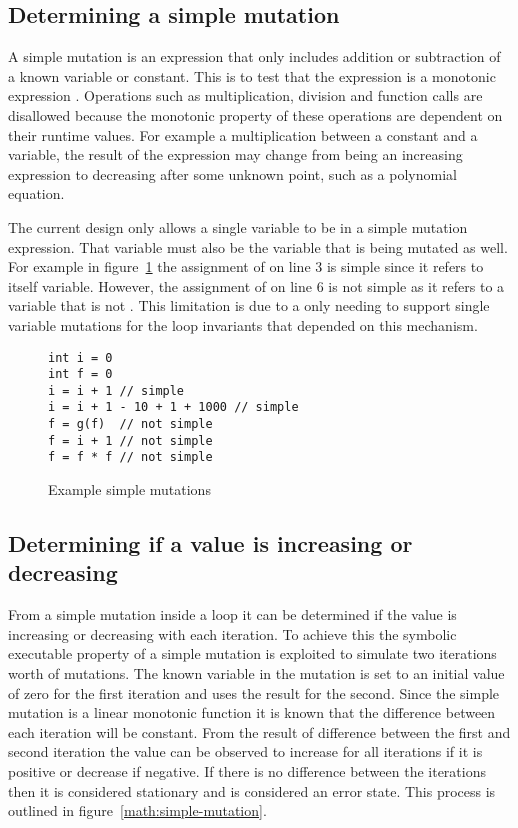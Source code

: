 \subsection{Determining a simple mutation}\label{s:simple-mut}


A simple mutation is an expression that only includes addition or subtraction
of a known variable or constant.
This is to test that the expression is a monotonic expression \cite{tanton2005encyclopedia}.
Operations such as multiplication, division and function calls are disallowed
because the monotonic property of these operations are dependent on their
runtime values.
For example a multiplication between a constant and a variable,
the result of the expression may change from being an increasing expression
to decreasing after some unknown point, such as a polynomial equation.

The current design only allows a single variable to be in a simple mutation
expression.
That variable must also be the variable that is being mutated as well.
For example in figure~\ref{lst:simple-mutations} the assignment of  on
line 3 is simple since it refers to itself variable.
However, the assignment of  on line 6 is not simple as
it refers to a variable that is not .
This limitation is due to a only needing to 
support single variable mutations for the loop invariants
that depended on this mechanism.

\begin{figure}[ht]
\begin{lstlisting}
int i = 0
int f = 0
i = i + 1 // simple
i = i + 1 - 10 + 1 + 1000 // simple
f = g(f)  // not simple
f = i + 1 // not simple
f = f * f // not simple
\end{lstlisting}
\caption{Example simple mutations}
\label{lst:simple-mutations}
\end{figure}

\subsection{Determining if a value is increasing or decreasing}\label{s:sequence-dir}


From a simple mutation inside a loop it can be determined if the value is
increasing or decreasing with each iteration.
To achieve this the symbolic executable property of a simple mutation is
exploited to simulate two iterations worth of mutations.
The known variable in the mutation is set to an initial value of zero for
the first iteration and uses the result for the second.
Since the simple mutation is a linear monotonic function it is known that
the difference between each iteration will be constant.
From the result of difference between the first and second iteration the
value can be observed to increase for all iterations if it is positive or
decrease if negative. If there is no difference between the iterations then
it is considered stationary and is considered an error state.
This process is outlined in figure~\ref{math:simple-mutation}.

